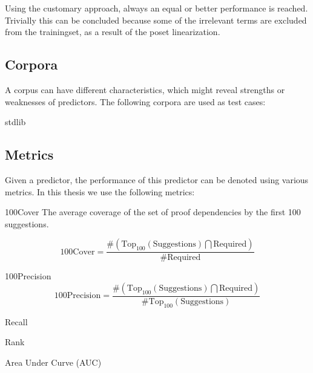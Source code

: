 Using the customary approach, always an equal or better performance is reached.
Trivially this can be concluded because some of the irrelevant terms are excluded from the trainingset, as a result of the poset linearization.

\subsection{Corpora}
A corpus can have different characteristics, which might reveal strengths or weaknesses of predictors.
The following corpora are used as test cases:

\begin{description}
	\item[\coq stdlib]
	\item[\compcert]
    \item[\formalin]
    \item[\corn]
    \item[\mathcomp]
\end{description}

\subsection{Metrics}
Given a predictor, the performance of this predictor can be denoted using various metrics.
In this thesis we use the following metrics:


\begin{definition}{100Cover}
The average coverage of the set of proof dependencies by the first 100 suggestions.

\[ \text{100Cover} = \frac{ \#( \text{Top}_{100}(\text{Suggestions}) \bigcap \text{Required}) } { \#\text{Required} } \]
\end{definition}


\begin{definition}{100Precision}
\[ \text{100Precision} = \frac{ \#( \text{Top}_{100}(\text{Suggestions}) \bigcap \text{Required}) } { \#\text{Top}_{100}(\text{Suggestions}) } \]
\end{definition}

\begin{definition}{Recall}
\end{definition}

\begin{definition}{Rank}
\end{definition}

\begin{definition}{Area Under Curve (AUC)}
\end{definition}

